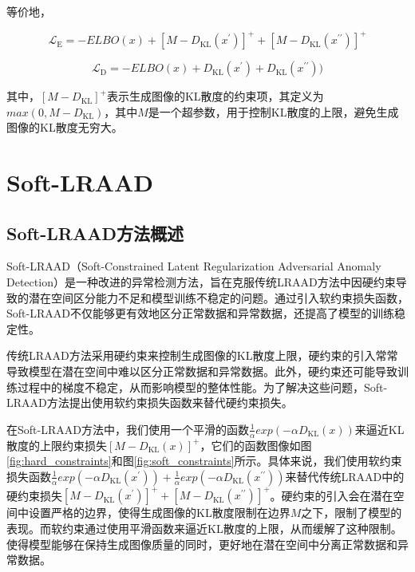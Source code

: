 \documentclass{article}
\begin{document}
等价地，

\begin{equation}
  \mathcal{L}_{\mathrm{E}}=-ELBO(x) + [M - D_{\mathrm{KL}}(x^\prime)]^{+} + [M - D_{\mathrm{KL}}(x^{\prime\prime})]^{+}
\end{equation}

\begin{equation}
  \mathcal{L}_{\text {D}}=-ELBO(x) + D_\mathrm{KL}(x^\prime) + D_\mathrm{KL}(x^{\prime\prime}))
\end{equation}

其中，$[M - D_{\mathrm{KL}}]^{+}$表示生成图像的KL散度的约束项，其定义为$max(0, M - D_{\mathrm{KL}})$，其中$M$是一个超参数，用于控制KL散度的上限，避免生成图像的KL散度无穷大。




\section{Soft-LRAAD}

\subsection{Soft-LRAAD方法概述}

Soft-LRAAD（Soft-Constrained Latent Regularization Adversarial Anomaly Detection）是一种改进的异常检测方法，旨在克服传统LRAAD方法中因硬约束导致的潜在空间区分能力不足和模型训练不稳定的问题。通过引入软约束损失函数，Soft-LRAAD不仅能够更有效地区分正常数据和异常数据，还提高了模型的训练稳定性。

传统LRAAD方法采用硬约束来控制生成图像的KL散度上限，硬约束的引入常常导致模型在潜在空间中难以区分正常数据和异常数据。此外，硬约束还可能导致训练过程中的梯度不稳定，从而影响模型的整体性能。为了解决这些问题，Soft-LRAAD方法提出使用软约束损失函数来替代硬约束损失。

在Soft-LRAAD方法中，我们使用一个平滑的函数$\frac{1}{\alpha}exp(- \alpha D_{\mathrm{KL}}(x))$来逼近KL散度的上限约束损失$[M - D_{\mathrm{KL}}(x)]^{+}$，它们的函数图像如图\ref{fig:hard_constraints}和图\ref{fig:soft_constraints}所示。具体来说，我们使用软约束损失函数$\frac{1}{\alpha}exp(- \alpha D_{\mathrm{KL}}(x^\prime)) + \frac{1}{\alpha}exp(-\alpha D_{\mathrm{KL}}(x^{\prime\prime}))$来替代传统LRAAD中的硬约束损失$[M - D_{\mathrm{KL}}(x^\prime)]^{+} + [M - D_{\mathrm{KL}}(x^{\prime\prime})]^{+}$。硬约束的引入会在潜在空间中设置严格的边界，使得生成图像的KL散度限制在边界$M$之下，限制了模型的表现。而软约束通过使用平滑函数来逼近KL散度的上限，从而缓解了这种限制。使得模型能够在保持生成图像质量的同时，更好地在潜在空间中分离正常数据和异常数据。
\end{document}
